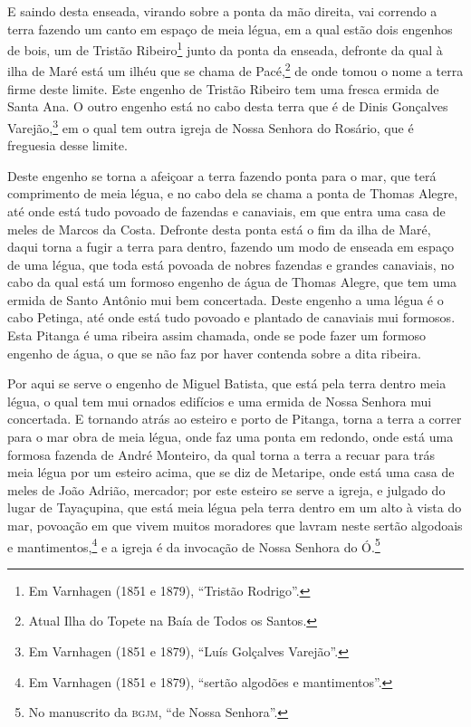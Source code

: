 E saindo desta enseada, virando sobre a ponta da mão direita, vai correndo a terra fazendo
um canto em espaço de meia légua, em a qual estão dois engenhos de bois, um de Tristão
Ribeiro\footnote{ Em Varnhagen (1851 e 1879), ``Tristão Rodrigo''.} junto da ponta da
enseada, defronte da qual à ilha de Maré está um ilhéu que se chama de Pacé,\footnote{
Atual Ilha do Topete na Baía de Todos os Santos.} de onde tomou o nome a terra firme deste
limite. Este engenho de Tristão Ribeiro tem uma fresca ermida de Santa Ana. O outro
engenho está no cabo desta terra que é de Dinis Gonçalves Varejão,\footnote{ Em Varnhagen
(1851 e 1879), ``Luís Golçalves Varejão''.} em o qual tem outra igreja de Nossa Senhora do
Rosário, que é freguesia desse limite.

Deste engenho se torna a afeiçoar a terra fazendo ponta para o mar, que terá comprimento
de meia légua, e no cabo dela se chama a ponta de Thomas Alegre, até onde está tudo
povoado de fazendas e canaviais, em que entra uma casa de meles de Marcos da Costa.
Defronte desta ponta está o fim da ilha de Maré, daqui torna a fugir a terra para dentro,
fazendo um modo de enseada em espaço de uma légua, que toda está povoada de nobres
fazendas e grandes canaviais, no cabo da qual está um formoso engenho de água de Thomas
Alegre, que tem uma ermida de Santo Antônio mui bem concertada. Deste engenho a uma légua
é o cabo Petinga, até onde está tudo povoado e plantado de canaviais mui formosos. Esta
Pitanga é uma ribeira assim chamada, onde se pode fazer um formoso engenho de água, o que
se não faz por haver contenda sobre a dita ribeira.

Por aqui se serve o engenho de Miguel Batista, que está pela terra dentro meia légua, o
qual tem mui ornados edifícios e uma ermida de Nossa Senhora mui concertada. E tornando
atrás ao esteiro e porto de Pitanga, torna a terra a correr para o mar obra de meia légua,
onde faz uma ponta em redondo, onde está uma formosa fazenda de André Monteiro, da qual
torna a terra a recuar para trás meia légua por um esteiro acima, que se diz de Metaripe,
onde está uma casa de meles de João Adrião, mercador; por este esteiro se serve a igreja,
e julgado do lugar de Tayaçupina, que está meia légua pela terra dentro em um alto à vista
do mar, povoação em que vivem muitos moradores que lavram neste sertão algodoais e
mantimentos,\footnote{ Em Varnhagen (1851 e 1879), ``sertão algodões e mantimentos''.} e a
igreja é da invocação de Nossa Senhora do Ó.\footnote{ No manuscrito da \textsc{bgjm}, ``de
Nossa Senhora''.}

